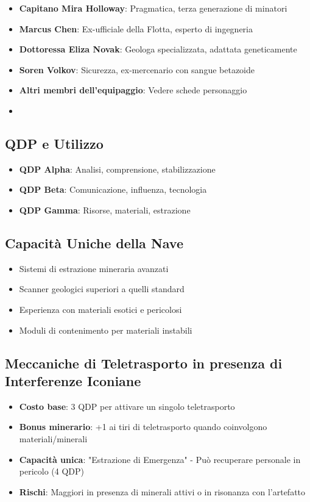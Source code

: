 \documentclass[letterpaper,twocolumn,openany,nodeprecatedcode]{dndbook}
\begin{document}
\begin{itemize}
    \item \textbf{Capitano Mira Holloway}: Pragmatica, terza generazione di minatori
    \item \textbf{Marcus Chen}: Ex-ufficiale della Flotta, esperto di ingegneria
    \item \textbf{Dottoressa Eliza Novak}: Geologa specializzata, adattata geneticamente
    \item \textbf{Soren Volkov}: Sicurezza, ex-mercenario con sangue betazoide
    \item \textbf{Altri membri dell'equipaggio}: Vedere schede personaggio
    \item 
\end{itemize}
\subsection{QDP e Utilizzo}
\begin{itemize}
    \item \textbf{QDP Alpha}: Analisi, comprensione, stabilizzazione
    \item \textbf{QDP Beta}: Comunicazione, influenza, tecnologia
    \item \textbf{QDP Gamma}: Risorse, materiali, estrazione
\end{itemize}

\subsection{Capacità Uniche della Nave}

\begin{itemize}
    \item Sistemi di estrazione mineraria avanzati
    \item Scanner geologici superiori a quelli standard
    \item Esperienza con materiali esotici e pericolosi
    \item Moduli di contenimento per materiali instabili
\end{itemize}

\subsection{Meccaniche di Teletrasporto in presenza di Interferenze Iconiane}

\begin{itemize}
    \item \textbf{Costo base}: 3 QDP per attivare un singolo teletrasporto
    \item \textbf{Bonus minerario}: +1 ai tiri di teletrasporto quando coinvolgono materiali/minerali
    \item \textbf{Capacità unica}: "Estrazione di Emergenza" - Può recuperare personale in pericolo (4 QDP)
    \item \textbf{Rischi}: Maggiori in presenza di minerali attivi o in risonanza con l'artefatto
\end{itemize}
\end{document}
